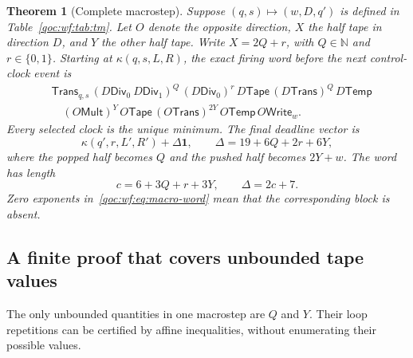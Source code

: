 \documentclass[11pt,letterpaper]{article}
\newtheorem{theorem}{Theorem}[section]
\theoremstyle{definition}
\theoremstyle{remark}
\newcommand{\N}{\mathbb N}
\newcommand{\one}{\mathbf 1}
\newcommand{\clk}[1]{\mathsf{#1}}
\newcommand{\cani}{\kappa}
\begin{document}
\begin{theorem}[Complete macrostep]\label{qoc:wf:thm:macro}
Suppose $(q,s)\mapsto(w,D,q')$ is defined in Table~\ref{qoc:wf:tab:tm}. Let $O$ denote the opposite direction, $X$ the half tape in direction $D$, and $Y$ the other half tape. Write $X=2Q+r$, with $Q\in\N$ and $r\in\{0,1\}$. Starting at $\cani(q,s,L,R)$, the exact firing word before the next control-clock event is
\begin{equation}\label{qoc:wf:eq:macro-word}
\begin{split}
 &\clk{Trans}_{q,s}\,
 (D\clk{Div}_0\ D\clk{Div}_1)^Q\,
 (D\clk{Div}_0)^r\,
 D\clk{Tape}\,
 (D\clk{Trans})^Q\,
 D\clk{Temp}\\
 &\hspace{1em}(O\clk{Mult})^Y\,
 O\clk{Tape}\,
 (O\clk{Trans})^{2Y}\,
 O\clk{Temp}\,
 O\clk{Write}_{w}.
\end{split}
\end{equation}
Every selected clock is the unique minimum. The final deadline vector is
\begin{equation}\label{qoc:wf:eq:macro-identity}
 \cani(q',r,L',R')+\Delta\one,
 \qquad \Delta=19+6Q+2r+6Y,
\end{equation}
where the popped half becomes $Q$ and the pushed half becomes $2Y+w$. The word has length
\begin{equation}\label{qoc:wf:eq:cstep}
 c=6+3Q+r+3Y,\qquad \Delta=2c+7.
\end{equation}
Zero exponents in~\eqref{qoc:wf:eq:macro-word} mean that the corresponding block is absent.
\end{theorem}

\subsection{A finite proof that covers unbounded tape values}
The only unbounded quantities in one macrostep are $Q$ and $Y$. Their loop repetitions can be certified by affine inequalities, without enumerating their possible values.
\end{document}
